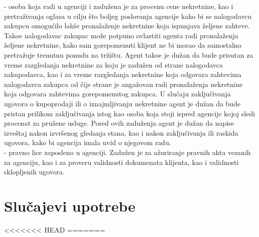 \documentclass{article}
\begin{document}
 - osoba koja radi u agenciji i zadu\v {z}ena je za procenu cene nekretnine, kao i pretra\v {z}ivanja oglasa u cilju \v {s}to boljeg poslovanja agencije kako bi se nalogodavcu zakupcu omogu\' cilo lak\v {s}e pronala\v {z}enje nekretnine koja ispunjava \v {z}eljene zahteve. Tako\dj e nalogodavac zakupac mo\v {z}e potpuno ovlastiti agenta radi pronala\v {z}enja \v {z}eljene nekretnine, kako sam gorepomenuti klijent ne bi morao da samostalno pretra\v {z}uje trenutnu ponudu na tr\v {z}i\v {s}tu. Agent tako\dj e je du\v {z}an da bude prisutan za vreme razgledanja nekretnine za koju je zadu\v {z}en od strane nalogodavca zakupodavca, kao i za vreme razgledanja nekretnine koja odgovara zahtevima nalogodavca zakupca od \v {c}ije strane je anga\v {z}ovan radi pronala\v {z}enja nekretnine koja odgovara zahtevima gorepomenutog zakupca. U slu\v {c}aju zaklju\v {c}ivanja ugovora o kupoprodaji ili o iznajmljivanju nekretnine agent je du\v {z}an da bude pristan prilikom zaklju\v {c}ivanja istog kao osoba koja stoji ispred agencije kojoj sledi procenat za pru\v {z}ene usluge. Pored ovih zadu\v {z}enja agent je du\v {z}an da napise izve\v {s}taj nakon izvr\v {s}enog gledanja stana, kao i nakon zaklju\v {c}ivanja ili raskida ugovora, kako bi agencija imala uvid o njegovom radu.\\

 - pravno lice zaposleno u agenciji. Zadu\v {z}en je za a\v {z}uriranje pravnih akta vezanih za agenciju, kao i za proveru validnosti dokumenata klijenta, kao i validnosti sklopljenih ugovora.\\ 

\newpage
\section{\bfseries Slu\v{c}ajevi upotrebe}
<<<<<<< HEAD
=======
\end{document}
